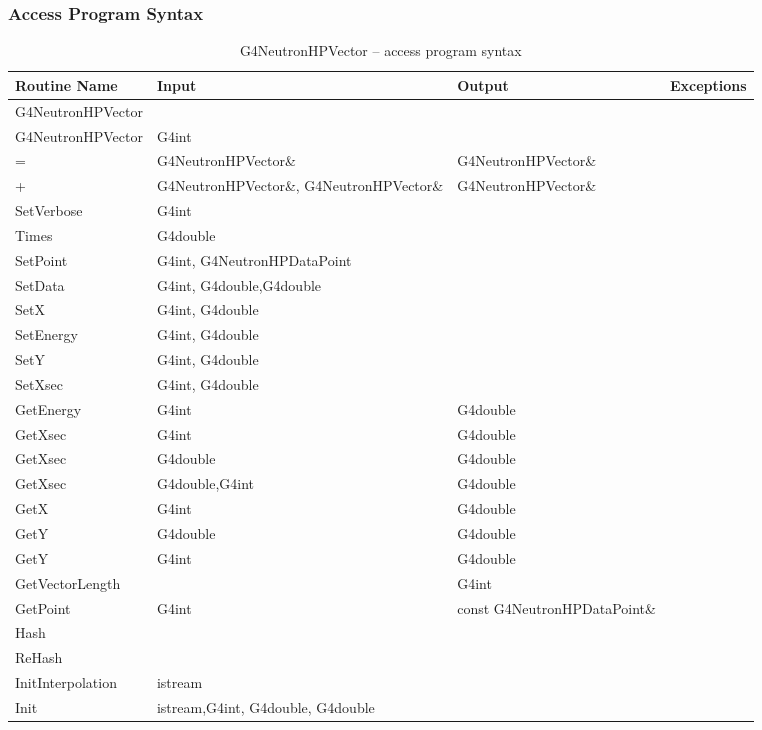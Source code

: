 \documentclass[12pt]{article}
\begin{document}
\subsubsection{Access Program Syntax}%
\begin{longtable}{p{}p{}p{}p{}}
\caption{G4NeutronHPVector -- access program syntax}\label{Table_NeutronHPVectorInterface}\\
\toprule
\bf Routine Name & \bf Input & \bf Output & \bf Exceptions \\\midrule
\arrayrulecolor{lightgray}
G4NeutronHPVector & & & \\\hline
G4NeutronHPVector & G4int & & \\\hline
= & G4NeutronHPVector\& & G4NeutronHPVector\& &\\\hline
+ & G4NeutronHPVector\&, G4NeutronHPVector\& & G4NeutronHPVector\& &\\\hline
SetVerbose & G4int & & \\\hline
Times &G4double & & \\\hline
SetPoint  &G4int, G4NeutronHPDataPoint & & \\\hline
SetData & G4int, G4double,G4double& & \\\hline
SetX & G4int, G4double & & \\\hline
SetEnergy & G4int, G4double & & \\\hline
SetY & G4int, G4double & & \\\hline
SetXsec & G4int, G4double & & \\\hline
GetEnergy & G4int & G4double & \\\hline
GetXsec & G4int & G4double & \\\hline
GetXsec & G4double & G4double & \\\hline
GetXsec & G4double,G4int & G4double & \\\hline
GetX & G4int & G4double & \\\hline
GetY & G4double & G4double & \\\hline
GetY & G4int & G4double & \\\hline
GetVectorLength & & G4int & \\\hline
GetPoint & G4int & const G4NeutronHPDataPoint\& & \\\hline
Hash & & & \\\hline
ReHash & & & \\\hline
InitInterpolation & istream & & \\\hline
Init & istream,G4int, G4double, G4double& & \\\hline

\end{longtable}
\end{document}
